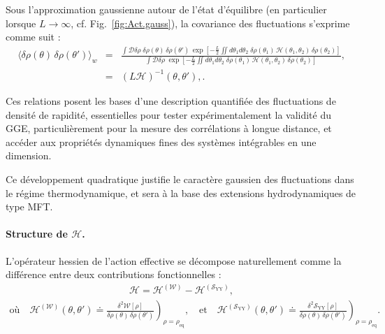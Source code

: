 \smallskip

Sous l’approximation gaussienne autour de l’état d’équilibre (en particulier lorsque \(L \to \infty\), cf. Fig.~\ref{fig:Act.gauss}), la covariance des fluctuations s’exprime comme suit :
\begin{eqnarray}
\langle \delta \rho(\theta) \, \delta \rho(\theta') \rangle_w &=& \frac{
 \displaystyle \int \mathcal{D} \delta \rho \; \delta \rho(\theta) \, \delta \rho(\theta')
    \, \exp \left[
        -\frac{L}{2}
        \iint  d \theta_1 d \theta_2 \;
        \delta \rho(\theta_1) \, \mathcal{H}(\theta_1, \theta_2 )  \, \delta \rho(\theta_2)
    \right]
}{
    \displaystyle \int \mathcal{D} \delta \rho \;
    \exp \left[
        -\frac{L}{2}
        \iint  d \theta_1 d \theta_2 \;
        \delta \rho(\theta_1) \, \mathcal{H}(\theta_1, \theta_2 )  \, \delta \rho(\theta_2)
    \right]
}, \nonumber \\
&=& (L \mathcal{H})^{-1}(\theta, \theta' ), \label{eq:fluctuations}
\label{chap:fluctu:eq:fluctuations}.
\end{eqnarray}

\medskip

Ces relations posent les bases d'une description quantifiée des fluctuations de densité de rapidité, essentielles pour tester expérimentalement la validité du \gls{GGE}, particulièrement pour la mesure des  corrélations à longue distance, et accéder aux propriétés dynamiques fines des systèmes intégrables en une dimension.

\smallskip

Ce développement quadratique justifie le caractère gaussien des fluctuations dans le régime thermodynamique, et sera à la base des extensions hydrodynamiques de type \gls{MFT}.

\paragraph{Structure de \(\mathcal{H}\).}

L’opérateur hessien de l’action effective se décompose naturellement comme la différence entre deux contributions fonctionnelles :
\begin{eqnarray}
	\mathcal{H} = \mathcal{H}^{(\mathcal{W})} - \mathcal{H}^{(\mathcal{S}_{\mathrm{YY}})},
\end{eqnarray}
\begin{eqnarray}
	\mbox{où} \quad \mathcal{H}^{(\mathcal{W})}(\theta,\theta') \doteq \left. \frac{\delta^2 \mathcal{W}[\rho]}{\delta \rho(\theta)\, \delta \rho(\theta')} \right)_{\rho = \rho_{\mathrm{eq}}}, \quad \text{et} \quad \mathcal{H}^{(\mathcal{S}_{\mathrm{YY}})}(\theta,\theta') \doteq \left. \frac{\delta^2 \mathcal{S}_{\mathrm{YY}}[\rho]}{\delta \rho(\theta)\, \delta \rho(\theta')} \right)_{\rho = \rho_{\mathrm{eq}}}.
\end{eqnarray}

